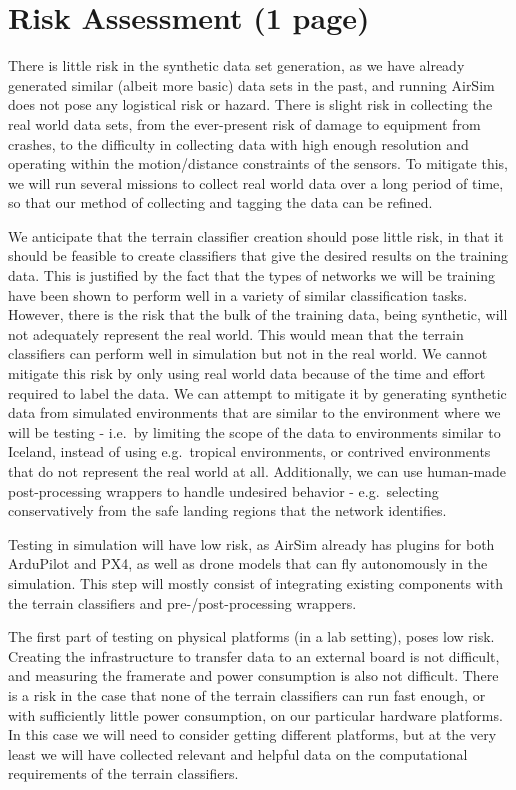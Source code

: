 \section{Risk Assessment (1 page)}
\label{section:risk_assessment}

There is little risk in the synthetic data set generation, as we have already generated similar
(albeit more basic) data sets in the past, and running AirSim does not pose any logistical risk or hazard.
There is slight risk in collecting the real world data sets, from the ever-present risk of damage
to equipment from crashes, to the difficulty in collecting data with high enough resolution and
operating within the motion/distance constraints of the sensors.
To mitigate this, we will run several missions to collect real world data over a long period of time,
so that our method of collecting and tagging the data can be refined.

We anticipate that the terrain classifier creation should pose little risk, in that it should be
feasible to create classifiers that give the desired results on the training data.
This is justified by the fact that the types of networks we will be training have been shown to
perform well in a variety of similar classification tasks.
However, there is the risk that the bulk of the training data, being synthetic, will not adequately
represent the real world.
This would mean that the terrain classifiers can perform well in simulation
but not in the real world.
We cannot mitigate this risk by only using real world data because of the time and effort
required to label the data.
We can attempt to mitigate it by generating synthetic data from simulated environments that are
similar to the environment where we will be testing - i.e.~by limiting the scope of the data
to environments similar to Iceland, instead of using e.g.~tropical environments,
or contrived environments that do not represent the real world at all.
Additionally, we can use human-made post-processing wrappers to handle undesired behavior -
e.g.~selecting conservatively from the safe landing regions that the network identifies.

Testing in simulation will have low risk, as AirSim already has plugins for both ArduPilot and PX4,
as well as drone models that can fly autonomously in the simulation.
This step will mostly consist of integrating existing components with the terrain classifiers and
pre-/post-processing wrappers.

The first part of testing on physical platforms (in a lab setting), poses low risk.
Creating the infrastructure to transfer data to an external board is not difficult,
and measuring the framerate and power consumption is also not difficult.
There is a risk in the case that none of the terrain classifiers can run fast enough,
or with sufficiently little power consumption, on our particular hardware platforms.
In this case we will need to consider getting different platforms, but at the very least we will
have collected relevant and helpful data on the computational requirements of the terrain classifiers.

